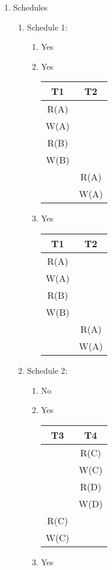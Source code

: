 \documentclass{report}
\begin{document}
\begin{enumerate}
		\item Schedules
		\begin{enumerate}
			\item Schedule 1:
			\begin{enumerate}
				\item Yes
				\item Yes \\
				\begin{tabular}{c c} \\
				T1 & T2 \\
				\hline 
				R(A) & \\
				W(A) & \\ 
				R(B) & \\ 
				W(B) & \\
 					 & R(A) \\
 					 & W(A)
				\end{tabular}
				\item Yes \\
				\begin{tabular}{c c} \\
				T1 & T2 \\
				\hline 
				R(A) & \\
				W(A) & \\ 
				R(B) & \\ 
				W(B) & \\
 					 & R(A) \\
 					 & W(A)
				\end{tabular}
			\end{enumerate}
			\item Schedule 2:
			\begin{enumerate}
				\item No
				\item Yes\\
				\begin{tabular}{c c} \\
				T3 & T4 \\
				\hline 
				& R(C) \\
				& W(C) \\
				& R(D) \\ 
				& W(D)\\ 
				R(C) & \\ 
				W(C) & \\
				\end{tabular}
				\item Yes \\
				\begin{tabular}{c c} \\

\end{tabular}
\end{enumerate}
\end{enumerate}
\end{enumerate}
\end{document}
